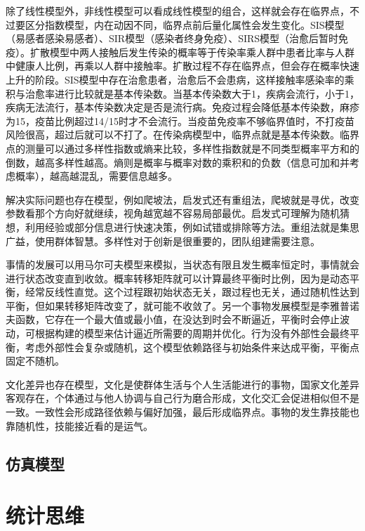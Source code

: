 \documentclass[]{tufte-book}
\begin{document}
除了线性模型外，非线性模型可以看成线性模型的组合，这样就会存在临界点，不过要区分指数模型，内在动因不同，临界点前后量化属性会发生变化。SIS模型（易感者感染易感者）、SIR模型（感染者终身免疫）、SIRS模型（治愈后暂时免疫）。扩散模型中两人接触后发生传染的概率等于传染率乘人群中患者比率与人群中健康人比例，再乘以人群中接触率。扩散过程不存在临界点，但会存在概率快速上升的阶段。SIS模型中存在治愈患者，治愈后不会患病，这样接触率感染率的乘积与治愈率进行比较就是基本传染数。当基本传染数大于1，疾病会流行，小于1，疾病无法流行，基本传染数决定是否是流行病。免疫过程会降低基本传染数，麻疹为15，疫苗比例超过14/15时才不会流行。当疫苗免疫率不够临界值时，不打疫苗风险很高，超过后就可以不打了。在传染病模型中，临界点就是基本传染数。临界点的测量可以通过多样性指数或熵来比较，多样性指数就是不同类型概率平方和的倒数，越高多样性越高。熵则是概率与概率对数的乘积和的负数（信息可加和并考虑概率），越高越混乱，需要信息越多。

解决实际问题也存在模型，例如爬坡法，启发式还有重组法，爬坡就是寻优，改变参数看那个方向好就继续，视角越宽越不容易局部最优。启发式可理解为随机猜想，利用经验或部分信息进行快速决策，例如试错或排除等方法。重组法就是集思广益，使用群体智慧。多样性对于创新是很重要的，团队组建需要注意。

事情的发展可以用马尔可夫模型来模拟，当状态有限且发生概率恒定时，事情就会进行状态改变直到收敛。概率转移矩阵就可以计算最终平衡时比例，因为是动态平衡，经常反线性直觉。这个过程跟初始状态无关，跟过程也无关，通过随机性达到平衡，但如果转移矩阵改变了，就可能不收敛了。另一个事物发展模型是李雅普诺夫函数，它存在一个最大值或最小值，在没达到时会不断逼近，平衡时会停止波动，可根据构建的模型来估计逼近所需要的周期并优化。行为没有外部性会最终平衡，考虑外部性会复杂或随机，这个模型依赖路径与初始条件来达成平衡，平衡点固定不随机。

文化差异也存在模型，文化是使群体生活与个人生活能进行的事物，国家文化差异客观存在，个体通过与他人协调与自己行为磨合形成，文化交汇会促进相似但不是一致。一致性会形成路径依赖与偏好加强，最后形成临界点。事物的发生靠技能也靠随机性，技能接近看的是运气。

\hypertarget{ux4effux771fux6a21ux578b}{%
\subsection{仿真模型}\label{ux4effux771fux6a21ux578b}}

\hypertarget{ux7edfux8ba1ux601dux7ef4}{%
\section{统计思维}\label{ux7edfux8ba1ux601dux7ef4}}
\end{document}
